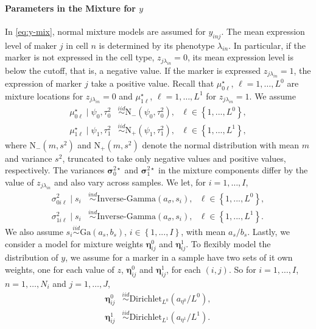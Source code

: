 \documentclass[12pt,]{article}
\newcommand{\bc}[1]{ \left\{#1\right\} }
\newcommand{\N}{ \mathcal{N} }
\newcommand{\iid}{\overset{iid}{\sim}}
\newcommand{\ind}{\overset{ind}{\sim}}
\def\N{\text{N}}
\def\G{\text{Ga}}
\def\IG{\text{Inverse-Gamma}}
\def\Dir{\text{Dirichlet}}
\def\mus{\mu^\star}
\def\bsig{\bm{\sigma}}
\begin{document}
\paragraph*{Parameters in the Mixture for $y$}
In \eqref{eq:y-mix}, normal mixture models are assumed for $y_{inj}$. The mean
expression level of maker $j$ in cell $n$ is determined by its phenotype
$\lambda_{in}$.  In particular, if the marker is not expressed in the cell
type, $z_{j \lambda_{in}}=0$, its mean expression level is below the cutoff,
that is, a negative value.  If the marker is expressed $z_{j \lambda_{in}}=1$,
the expression of marker $j$ take a positive value.   Recall that
$\mus_{0\ell}$, $\ell=1, \ldots, L^0$ are mixture locations for $z_{j
\lambda_{in}}=0$ and $\mus_{1\ell}$, $\ell=1, \ldots, L^1$ for $z_{j
\lambda_{in}}=1$.  We assume 
\begin{align*}
\mus_{0\ell} \mid \psi_0, \tau^2_0 &\iid \N_-(\psi_0, \tau^2_0), ~~~ \ell \in \bc{1,...,L^0}, \\
\mus_{1\ell} \mid \psi_1, \tau^2_1 &\iid \N_+(\psi_1, \tau^2_1), ~~~ \ell \in \bc{1,...,L^1}, 
\end{align*}
where \(\N_-(m,s^2)\) and \(\N_+(m,s^2)\) denote the normal distribution with
mean \(m\) and variance \(s^2\), truncated to take only negative values and
positive values, respectively.  The variances $\bsig^{2 \star}_0$ and $\bsig^{2 \star}_1$ in the mixture components differ
by the value of $z_{j \lambda_{in}}$ and also vary across samples. We let, for
\(i=1, \ldots, I\),
\begin{align*}
\sigma^2_{0i\ell} \mid s_i &\ind \IG(a_\sigma, s_i), ~~~ \ell \in \bc{1,...,L^0}, \\
\sigma^2_{1i\ell} \mid s_i &\ind \IG(a_\sigma, s_i), ~~~ \ell \in \bc{1,...,L^1}.  
\end{align*}
We also assume $s_i \iid \G(a_s, b_s)$, $i \in \bc{1,...,I}$, with mean
\(a_s/b_s\). Lastly, we consider a model for mixture weights $\bm\eta^0_{ij}$ and $\bm\eta^1_{ij}$. To flexibly model
the distribution of $y$, we assume for a marker in a sample have two sets of it
own weights, one for each value of $z$, $\bm\eta^0_{ij}$ and $\bm\eta^1_{ij}$,
for each $(i, j)$. So for \(i=1, \ldots, I\), \(n=1, \ldots, N_i\) and \(j=1,
\ldots, J\),
\begin{align*}
\bm\eta^0_{ij} &\iid \Dir_{L^0}(a_{\eta^0}/L^0), \\
\bm\eta^1_{ij} &\iid \Dir_{L^1}(a_{\eta^1}/L^1). 
\end{align*}
\end{document}
